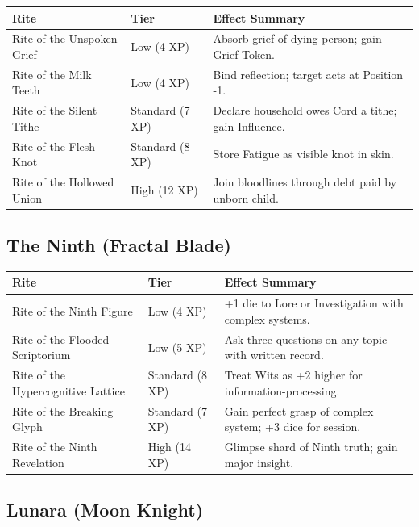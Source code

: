 \begin{longtable}{p{} p{} p{}}
\hline
\textbf{Rite} & \textbf{Tier} & \textbf{Effect Summary} \\
\hline
Rite of the Unspoken Grief & Low (4 XP) & Absorb grief of dying person; gain Grief Token. \\
Rite of the Milk Teeth & Low (4 XP) & Bind reflection; target acts at Position -1. \\
Rite of the Silent Tithe & Standard (7 XP) & Declare household owes Cord a tithe; gain Influence. \\
Rite of the Flesh-Knot & Standard (8 XP) & Store Fatigue as visible knot in skin. \\
Rite of the Hollowed Union & High (12 XP) & Join bloodlines through debt paid by unborn child. \\
\hline
\end{longtable}

\subsection{The Ninth (Fractal Blade)}

\begin{longtable}{p{} p{} p{}}
\hline
\textbf{Rite} & \textbf{Tier} & \textbf{Effect Summary} \\
\hline
Rite of the Ninth Figure & Low (4 XP) & +1 die to Lore or Investigation with complex systems. \\
Rite of the Flooded Scriptorium & Low (5 XP) & Ask three questions on any topic with written record. \\
Rite of the Hypercognitive Lattice & Standard (8 XP) & Treat Wits as +2 higher for information-processing. \\
Rite of the Breaking Glyph & Standard (7 XP) & Gain perfect grasp of complex system; +3 dice for session. \\
Rite of the Ninth Revelation & High (14 XP) & Glimpse shard of Ninth truth; gain major insight. \\
\hline
\end{longtable}

\subsection{Lunara (Moon Knight)}

